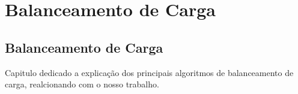 \pagestyle{empty}
\pagestyle{fancy}
\chapter{Balanceamento de Carga}

\section{Balanceamento de Carga}\label{cap2:mem}

Capitulo dedicado a explicação dos principais algoritmos de balanceamento de carga, realcionando com o nosso trabalho.